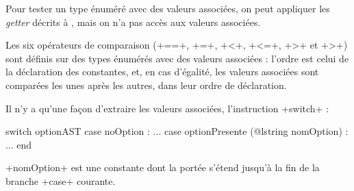Pour tester un type énuméré avec des valeurs associées, on peut appliquer les \emph{getter} décrits à , mais on n'a pas accès aux valeurs associées.

Les six opérateurs de comparaison (\ggs+==+, \ggs+\!=+, \ggs+<+, \ggs+<=+, \ggs+>+ et \ggs+>+) sont définis sur des types énumérés avec des valeurs associées : l'ordre est celui de la déclaration des constantes, et, en cas d'égalité, les valeurs associées sont comparées les unes après les autres, dans leur ordre de déclaration.

Il n'y a qu'une façon d'extraire les valeurs associées, l'instruction \ggs+switch+ :

\begin{galgascode}
switch optionAST
case noOption : ...
case optionPresente (@lstring nomOption) : ...
end
\end{galgascode}

\ggs+nomOption+ est une constante dont la portée s'étend jusqu'à la fin de la branche \ggs+case+ courante.
 

